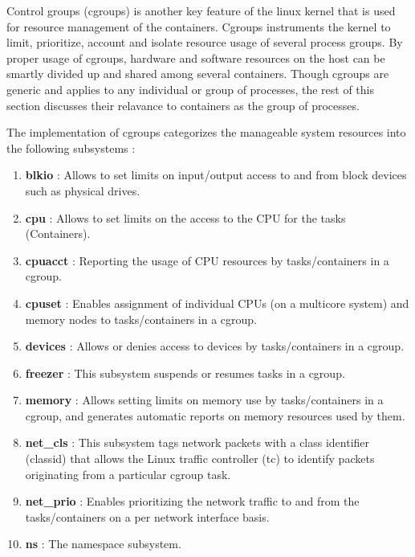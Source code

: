 Control groups (cgroups) \cite{cgroups} \cite{cgroups-rami-rosen} \cite{cgroups-redhat} is another key feature of the linux kernel that is used for resource management of the containers. Cgroups instruments the kernel to limit, prioritize, account and isolate resource usage of several process groups. By proper usage of cgroups, hardware and software resources on the host can be smartly divided up and shared among several containers. Though cgroups are generic and applies to any individual or group of processes, the rest of this section discusses their relavance to containers as the group of processes.

The implementation of cgroups categorizes the manageable system resources into the following subsystems : 


\begin{enumerate}
\item \textbf{blkio} : Allows to set limits on input/output access to and from block devices such as physical drives.


\item \textbf{cpu} : Allows to set limits on the access to the CPU for the tasks (Containers).


\item \textbf{cpuacct} : Reporting the usage of CPU resources by tasks/containers in a cgroup.


\item \textbf{cpuset} : Enables assignment of individual CPUs (on a multicore system) and memory nodes to tasks/containers in a cgroup.


\item \textbf{devices} : Allows or denies access to devices by tasks/containers in a cgroup.


\item \textbf{freezer} : This subsystem suspends or resumes tasks in a cgroup.
    
    
\item \textbf{memory} : Allows setting limits on memory use by tasks/containers in a cgroup, and generates automatic reports on memory resources used by them.
    
    
\item \textbf{net\_cls} : This subsystem tags network packets with a class identifier (classid) that allows the Linux traffic controller (tc) to identify packets originating from a particular cgroup task.


\item \textbf{net\_prio} : Enables prioritizing the network traffic to and from the tasks/containers on a per network interface basis.


\item \textbf{ns} : The namespace subsystem. 

\end{enumerate}


